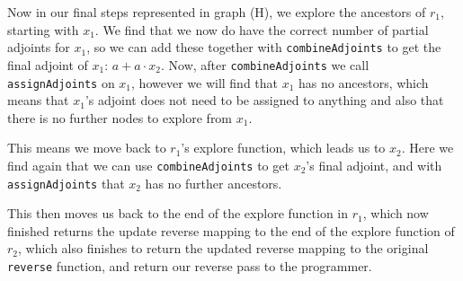         Now in our final steps represented in graph (H), we explore the ancestors of $r_1$, starting with $x_1$.
        We find that we now do have the correct number of partial adjoints for $x_1$, so we can add these together with \texttt{combineAdjoints} to get the final adjoint of $x_1$: $a+a\cdot x_2$.
        Now, after \texttt{combineAdjoints} we call \texttt{assignAdjoints} on $x_1$, however we will find that $x_1$ has no ancestors, which means that $x_1$'s adjoint does not need to be assigned to anything and also that there is no further nodes to explore from $x_1$.

        This means we move back to $r_1$'s explore function, which leads us to $x_2$.
        Here we find again that we can use \texttt{combineAdjoints} to get $x_2$'s final adjoint, and with\\\texttt{assignAdjoints} that $x_2$ has no further ancestors.

        This then moves us back to the end of the explore function in $r_1$, which now finished returns the update reverse mapping to the end of the explore function of $r_2$, which also finishes to return the updated reverse mapping to the original \texttt{reverse} function, and return our reverse pass to the programmer.
        
        \begin{figure}[p]
        \end{figure}

